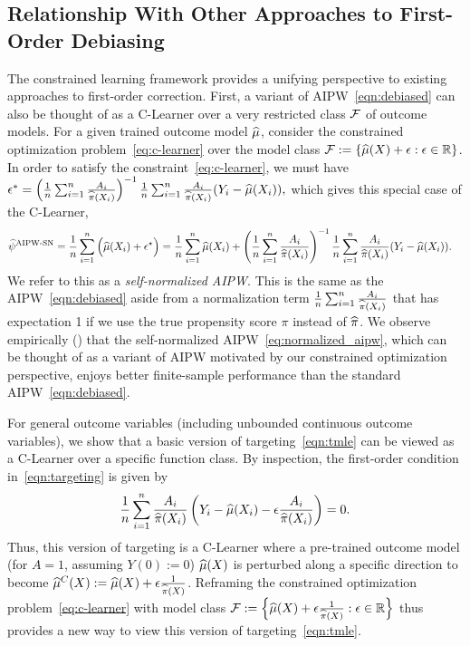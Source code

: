 \subsection{Relationship With Other Approaches to First-Order Debiasing}
\label{sec:other_methods}
 The constrained learning framework provides a unifying 
perspective to existing approaches to first-order correction. %
First, a variant of AIPW~\eqref{eqn:debiased} can also be thought of as a C-Learner over a very restricted class $\mathcal{F}$ of outcome models. For a given trained outcome model $\widehat{\mu}$,
consider the constrained optimization problem~\eqref{eq:c-learner} over the model class $\mathcal F := \{\widehat{\mu}(X)+\epsilon: \epsilon \in \mathbb{R}\}$. In order to satisfy the constraint~\eqref{eq:c-learner}, we must have
$
\epsilon^* = 
\left(\frac{1}{n} \sum_{i=1}^n 
\frac{A_i}{\widehat{\pi}(X_i)} \right)^{-1}
\frac{1}{n} \sum_{i=1}^n  \frac{A_i}{\widehat{\pi}(X_i)}(Y_i-\widehat{\mu}(X_i)),
$
which gives this special case of the C-Learner, %
\begin{align}
    \what{\psi}^{\textrm {AIPW-SN}}
    &= \frac{1}{n} \sum_{i=1}^n \Big(\what{\mu}(X_i)
    + \epsilon^\star\Big) %
    = \frac{1}{n} \sum_{i=1}^n \what{\mu}(X_i) + 
    \left(\frac{1}{n} \sum_{i=1}^n 
    \frac{A_i}{\what{\pi}(X_i)} \right)^{-1}
    \frac{1}{n} \sum_{i=1}^n \frac{A_i}{\what{\pi}(X_i)}(Y_i-\what\mu(X_i)). \label{eq:normalized_aipw} 
\end{align}
 We refer to this as a \emph{self-normalized AIPW}. 
This is the same as the AIPW~\eqref{eqn:debiased} aside from a normalization term  $\frac{1}{n}\sum_{i=1}^n \frac{A_i}{\widehat{\pi}(X_i)}$ that has expectation 1 if we use the true propensity score $\pi$ instead of $\widehat{\pi}$.
We observe empirically () that the self-normalized AIPW~\eqref{eq:normalized_aipw}, which can be thought of as a variant of AIPW motivated by our constrained optimization perspective, 
enjoys better finite-sample performance than the standard AIPW~\eqref{eqn:debiased}.

For general outcome variables (including unbounded continuous outcome variables), we show that a basic version of targeting~\eqref{eqn:tmle} can
be viewed as a C-Learner over a specific function class. 
By inspection, the first-order condition in~\eqref{eqn:targeting} is given by 
\begin{equation}
    \label{eqn:tmle-foc}
    \frac{1}{n} \sum_{i=1}^n 
    \frac{A_i}{\widehat{\pi}(X_i)} 
    \left(Y_i - \widehat{\mu}(X_i) 
    - \epsilon \frac{A_i}{\widehat{\pi}(X_i)}
    \right) = 0.
\end{equation}
Thus, this version of targeting is a C-Learner where a pre-trained outcome model (for $A=1$, assuming $Y(0):=0$)
$\widehat{\mu}(X)$ is perturbed along a specific direction to become 
$\widehat{\mu}^C(X):=\widehat{\mu}(X)+\epsilon \frac{1}{\widehat{\pi}(X)}$.
Reframing the constrained optimization problem~\eqref{eq:c-learner} with model class $\mathcal F := \left\{\widehat{\mu}(X)+\epsilon \frac{1}{\widehat{\pi}(X)}: \epsilon \in \mathbb{R} \right\}$ thus provides a new way to view this version of targeting~\eqref{eqn:tmle}. %

